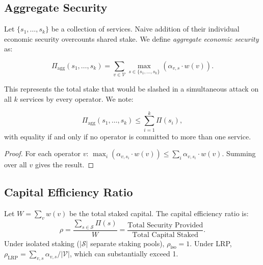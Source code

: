 \subsection{Aggregate Security}

Let $\{s_1, \ldots, s_k\}$ be a collection of services. Naive addition of their individual
economic security overcounts shared stake. We define \emph{aggregate economic security} as:

\begin{equation}
\Pi_{\text{agg}}(s_1,\ldots,s_k) = \sum_{v \in \mathcal{V}} \max_{s \in \{s_1,\ldots,s_k\}} (\alpha_{v,s} \cdot w(v)).
\label{eq:aggregate}
\end{equation}

This represents the total stake that would be slashed in a simultaneous attack on all $k$
services by every operator. We note:

\begin{proposition}
\[
  \Pi_{\text{agg}}(s_1,\ldots,s_k) \leq \sum_{i=1}^k \Pi(s_i),
\]
with equality if and only if no operator is committed to more than one service.
\end{proposition}

\begin{proof}
For each operator $v$: $\max_{i}(\alpha_{v,s_i} \cdot w(v)) \leq \sum_i \alpha_{v,s_i} \cdot w(v)$.
Summing over all $v$ gives the result.
\end{proof}

\subsection{Capital Efficiency Ratio}

\begin{definition}
Let $W = \sum_{v} w(v)$ be the total staked capital. The capital efficiency ratio is:
\[
  \rho = \frac{\sum_{s \in \mathcal{S}} \Pi(s)}{W} = \frac{\text{Total Security Provided}}{\text{Total Capital Staked}}.
\]
Under isolated staking ($|\mathcal{S}|$ separate staking pools), $\rho_{\text{iso}} = 1$.
Under LRP, $\rho_{\text{LRP}} = \sum_{v,s} \alpha_{v,s} / |\mathcal{V}|$, which can
substantially exceed 1.
\end{definition}

